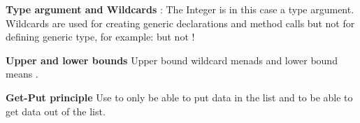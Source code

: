 \documentclass{article}
\begin{document}
\begin{Parallel}[v]{0.49\textwidth}{0.49\textwidth}
{        \textbf{Type argument and Wildcards}\newline
        :
        The Integer is in this case a type argument.\\
        Wildcards are used for creating generic declarations and method calls but not for defining generic type,
        for example:  but not !

        \textbf{Upper and lower bounds}\newline
        Upper bound wildcard menads  and lower bound means .

        \textbf{Get-Put principle}\newline
        Use  to only be able to put data in the list and
         to be able to get data out of the list.
    }
    \ParallelPar
\end{Parallel}
\end{document}
